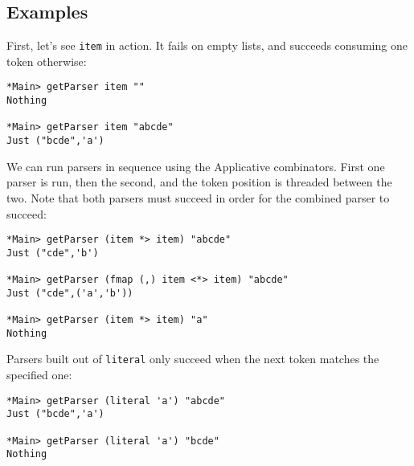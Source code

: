\documentclass{tmr}
\begin{document}
\subsection{Examples}
First, let's see \verb+item+ in action.  It fails on empty lists,
and succeeds consuming one token otherwise:
\begin{verbatim}
*Main> getParser item ""
Nothing

*Main> getParser item "abcde"
Just ("bcde",'a')
\end{verbatim}

We can run parsers in sequence using the Applicative combinators.  First one parser
is run, then the second, and the token position is threaded between the two.
Note that both parsers must succeed in order for the combined parser to succeed:
\begin{verbatim}
*Main> getParser (item *> item) "abcde"
Just ("cde",'b')

*Main> getParser (fmap (,) item <*> item) "abcde"
Just ("cde",('a','b'))

*Main> getParser (item *> item) "a"
Nothing
\end{verbatim}

Parsers built out of \verb+literal+ only succeed when the next token matches 
the specified one:
\begin{verbatim}
*Main> getParser (literal 'a') "abcde"
Just ("bcde",'a')

*Main> getParser (literal 'a') "bcde"
Nothing
\end{verbatim}
\end{document}
